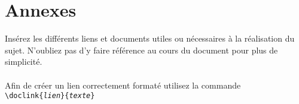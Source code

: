 \section{Annexes}
Insérez les différents liens et documents utiles ou nécessaires à la réalisation du sujet.
N'oubliez pas d'y faire référence au cours du document pour plus de simplicité.\\
\br \\
Afin de créer un lien correctement formaté utilisez la commande \\
\texttt{\textbackslash doclink\{\textit{lien}\}\{\textit{texte}\}}
